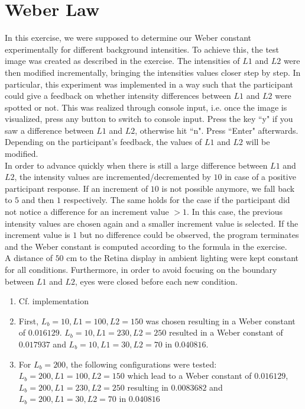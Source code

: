 \documentclass{article}
\begin{document}
\section{Weber Law}
In this exercise, we were supposed to determine our Weber constant experimentally for different background intensities. To achieve this, the test image was created as described in the exercise. The intensities of $L1$ and $L2$ were then modified incrementally, bringing the intensities values closer step by step. In particular, this experiment was implemented in a way such that the participant could give a feedback on whether intensity differences between $L1$ and $L2$ were spotted or not. This was realized through console input, i.e. once the image is visualized, press any button to switch to console input. Press the key ``y" if you saw a difference between $L1$ and $L2$, otherwise hit ``n". Press ``Enter" afterwards. Depending on the participant's feedback, the values of $L1$ and $L2$ will be modified. \\
In order to advance quickly when there is still a large difference between $L1$ and $L2$, the intensity values are incremented/decremented by $10$ in case of a positive participant response. If an increment of $10$ is not possible anymore, we fall back to $5$ and then $1$ respectively. The same holds for the case if the participant did not notice a difference for an increment value $>1$. In this case, the previous intensity values are chosen again and a smaller increment value is selected. If the increment value is $1$ but no difference could be observed, the program terminates and the Weber constant is computed according to the formula in the exercise.\\
A distance of $50$ cm to the Retina display in ambient lighting were kept constant for all conditions. Furthermore, in order to avoid focusing on the boundary between $L1$ and $L2$, eyes were closed before each new condition.
\begin{enumerate}
    \item Cf. implementation
    \item First, $L_b=10, L1=100, L2=150$ was chosen resulting in a Weber constant of $0.016129$. $L_b=10, L1=230, L2=250$ resulted in a Weber constant of $0.017937$ and $L_b=10, L1=30, L2=70$ in $0.040816$.
    \item For $L_b = 200$, the following configurations were tested: $L_b=200, L1=100, L2=150$ which lead to a Weber constant of $0.016129$, $L_b=200, L1=230, L2=250$ resulting in $0.0083682$ and  $L_b=200, L1=30, L2=70$ in $0.040816$
\end{enumerate}
\end{document}
